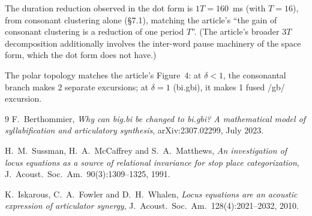 \documentclass[11pt,a4paper]{article}
\begin{document}
The duration reduction observed in the dot form is $1T = 160$~ms
(with $T=16$), from consonant clustering alone (\S7.1), matching the
article's ``the gain of consonant clustering is a reduction of one
period $T$''. (The article's broader $3T$ decomposition additionally
involves the inter-word pause machinery of the space form, which the
dot form does not have.)

The polar topology matches the article's Figure~4: at $\delta < 1$,
the consonantal branch makes 2 separate excursions; at $\delta = 1$
(bi.gbi), it makes 1 fused /gb/ excursion.

\begin{thebibliography}{9}
F.~Berthommier,
\textit{Why can big.bi be changed to bi.gbi? A mathematical model of
syllabification and articulatory synthesis},
arXiv:2307.02299, July 2023.

H.~M.~Sussman, H.~A.~McCaffrey and S.~A.~Matthews,
\textit{An investigation of locus equations as a source of relational
invariance for stop place categorization},
J.~Acoust.\ Soc.\ Am.\ 90(3):1309--1325, 1991.

K.~Iskarous, C.~A.~Fowler and D.~H.~Whalen,
\textit{Locus equations are an acoustic expression of articulator
synergy},
J.~Acoust.\ Soc.\ Am.\ 128(4):2021--2032, 2010.
\end{thebibliography}
\end{document}
